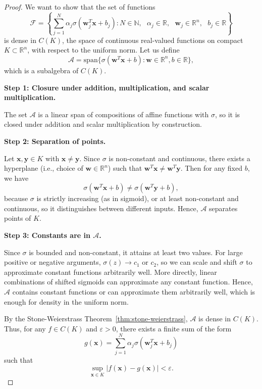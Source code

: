 \begin{proof}
We want to show that the set of functions
\[
\mathcal{F} = \left\{ \sum_{j=1}^{N} \alpha_j \sigma(\mathbf{w}_j^T \mathbf{x} + b_j) : N \in \mathbb{N}, \text{ } \alpha_j \in \mathbb{R}, \text{ }\mathbf{w}_j \in \mathbb{R}^n, \text{ }b_j \in \mathbb{R} \right\}
\]
is dense in \( C(K) \), the space of continuous real-valued functions on compact \( K \subset \mathbb{R}^n \), with respect to the uniform norm.
Let us define
\[
\mathcal{A} = \text{span}\{ \sigma(\mathbf{w}^T \mathbf{x} + b) : \mathbf{w} \in \mathbb{R}^n, b \in \mathbb{R} \},
\]
which is a subalgebra of \( C(K) \). 

\textbf{Step 1: Closure under addition, multiplication, and scalar multiplication.}

The set \( \mathcal{A} \) is a linear span of compositions of affine functions with \( \sigma \), so it is closed under addition and scalar multiplication by construction. 

\textbf{Step 2: Separation of points.}

Let \( \mathbf{x}, \mathbf{y} \in K \) with \( \mathbf{x} \neq \mathbf{y} \). Since \( \sigma \) is non-constant and continuous, there exists a hyperplane (i.e., choice of \( \mathbf{w} \in \mathbb{R}^n \)) such that \( \mathbf{w}^T \mathbf{x} \neq \mathbf{w}^T \mathbf{y} \). Then for any fixed \( b \), we have
\[
\sigma(\mathbf{w}^T \mathbf{x} + b) \neq \sigma(\mathbf{w}^T \mathbf{y} + b),
\]
because \( \sigma \) is strictly increasing (as in sigmoid), or at least non-constant and continuous, so it distinguishes between different inputs. Hence, \( \mathcal{A} \) separates points of \( K \).

\textbf{Step 3: Constants are in \( \mathcal{A} \).}

Since \( \sigma \) is bounded and non-constant, it attains at least two values. For large positive or negative arguments, \( \sigma(z) \to c_1 \) or \( c_2 \), so we can scale and shift \( \sigma \) to approximate constant functions arbitrarily well. More directly, linear combinations of shifted sigmoids can approximate any constant function.
Hence, \( \mathcal{A} \) contains constant functions or can approximate them arbitrarily well, which is enough for density in the uniform norm.

By the Stone-Weierstrass Theorem~\ref{thm:stone-weierstrass}, \( \mathcal{A} \) is dense in \( C(K) \). Thus, for any \( f \in C(K) \) and \( \varepsilon > 0 \), there exists a finite sum of the form
\[
g(\mathbf{x}) = \sum_{j=1}^{N} \alpha_j \sigma(\mathbf{w}_j^T \mathbf{x} + b_j)
\]
such that
\[
\sup_{\mathbf{x} \in K} |f(\mathbf{x}) - g(\mathbf{x})| < \varepsilon.
\]
\end{proof}


